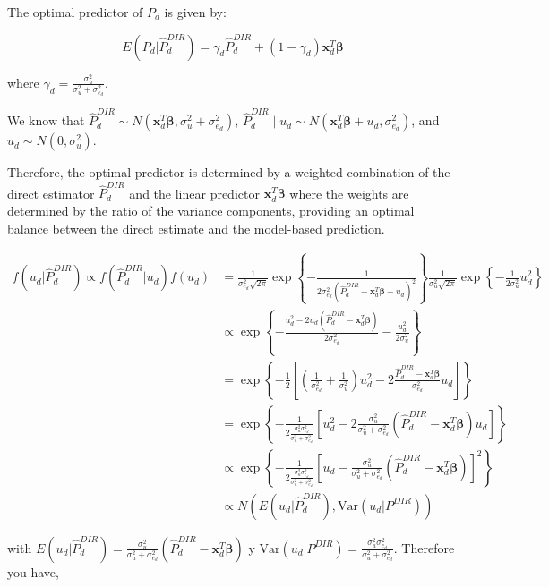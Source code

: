\documentclass[
  12pt,
]{book}
\begin{document}
The optimal predictor of \(P_d\) is given by:

\[E(P_d | \hat{P}^{DIR}_d) = \gamma_d\hat{P}^{DIR}_d + (1-\gamma_d)\boldsymbol{x}^{T}_{d}\boldsymbol \beta\]

where \(\gamma_d = \frac{\sigma_u^2}{\sigma_u^2 +\sigma_{e_d}^2}\).

We know that \(\hat{P}^{DIR}_d \sim N(\boldsymbol{x}^{T}_{d}\boldsymbol \beta, \sigma_u^2 +\sigma_{e_d}^2)\), \(\hat{P}^{DIR}_d \mid u_d \sim N(\boldsymbol{x}^{T}_{d}\boldsymbol \beta + u_d,\sigma_{e_d}^2)\), and \(u_d \sim N(0, \sigma^2_u)\).

Therefore, the optimal predictor is determined by a weighted combination of the direct estimator \(\hat{P}^{DIR}_d\) and the linear predictor \(\boldsymbol{x}^{T}_{d}\boldsymbol \beta\) where the weights are determined by the ratio of the variance components, providing an optimal balance between the direct estimate and the model-based prediction.

\begin{align*}
f(u_d| \hat{P}^{DIR}_d) \propto f(\hat{P}^{DIR}_d | u_d)f(u_d) & = \frac{1}{\sigma^2_{e_d}\sqrt{2\pi}}\exp\left\{-\frac{1}{2\sigma^2_{e_d}(\hat{P}^{DIR}_d-\boldsymbol{x}^{T}_{d}\boldsymbol \beta - u_d)^2}\right\} \frac{1}{\sigma^2_u\sqrt{2\pi}}\exp\left\{- \frac{1}{2\sigma^2_u}u_d^2\right\}\\
& \propto \exp\left\{-\frac{u_d^2 - 2u_d(\hat{P}^{DIR}_d-\boldsymbol{x}^{T}_{d}\boldsymbol \beta)}{2\sigma^2_{e_d}} - \frac{u_d^2}{2\sigma^2_u}\right\} \\
& = \exp\left\{-\frac{1}{2}\left[(\frac{1}{\sigma^2_{e_d}} + \frac{1}{\sigma^2_u})u_d^2 - 2\frac{\hat{P}^{DIR}_d-\boldsymbol{x}^{T}_{d}\boldsymbol \beta}{\sigma_{e_d}^2}u_d\right] \right\} \\
& = \exp \left\{ -\frac{1}{2\frac{\sigma_u^2\sigma_{e_d}^2}{\sigma_u^2 +\sigma_{e_d}^2}}\left[u_d^2 - 2\frac{\sigma_u^2}{\sigma_u^2 +\sigma_{e_d}^2}(\hat{P}^{DIR}_d-\boldsymbol{x}^{T}_{d}\boldsymbol \beta)u_d \right] \right\} \\
& \propto \exp \left\{ -\frac{1}{2\frac{\sigma_u^2\sigma_{e_d}^2}{\sigma_u^2 +\sigma_{e_d}^2}}\left[u_d -  \frac{\sigma_u^2}{\sigma_u^2 +\sigma_{e_d}^2}(\hat{P}^{DIR}_d-\boldsymbol{x}^{T}_{d}\boldsymbol \beta)\right]^2 \right\} \\
& \propto N(E(u_d|\hat{P}^{DIR}_d), \text{Var}(u_d|P^{DIR}))
\end{align*}

with \(E(u_d|\hat{P}^{DIR}_d) = \frac{\sigma_u^2}{\sigma_u^2 +\sigma_{e_d}^2}(\hat{P}^{DIR}_d-\boldsymbol{x}^{T}_{d}\boldsymbol \beta)\) y \(\text{Var}(u_d|P^{DIR}) = \frac{\sigma_u^2\sigma_{e_d}^2}{\sigma_u^2 +\sigma_{e_d}^2}\). Therefore you have,
\end{document}
